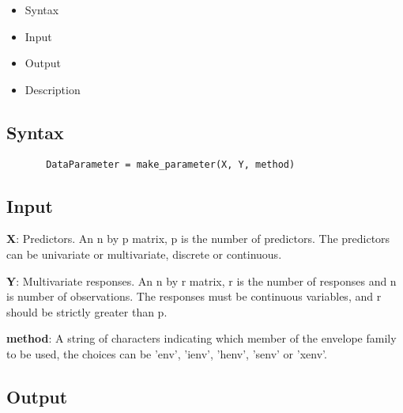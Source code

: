 \documentclass[a4paper,11pt,openany]{memoir}
\begin{document}
\begin{itemize}
\setlength{\itemsep}{-1ex}
   \item Syntax
   \item Input
   \item Output
   \item Description
\end{itemize}


\subsection*{Syntax}


\begin{verbatim}       DataParameter = make_parameter(X, Y, method)\end{verbatim}
    

\subsection*{Input}

\begin{par}
\textbf{X}: Predictors. An n by p matrix, p is the number of predictors. The predictors can be univariate or multivariate, discrete or continuous.
\end{par} \vspace{1em}
\begin{par}
\textbf{Y}: Multivariate responses. An n by r matrix, r is the number of responses and n is number of observations. The responses must be continuous variables, and r should be strictly greater than p.
\end{par} \vspace{1em}
\begin{par}
\textbf{method}: A string of characters indicating which member of the envelope family to be used, the choices can be 'env', 'ienv', 'henv', 'senv' or 'xenv'.
\end{par} \vspace{1em}


\subsection*{Output}
\end{document}
